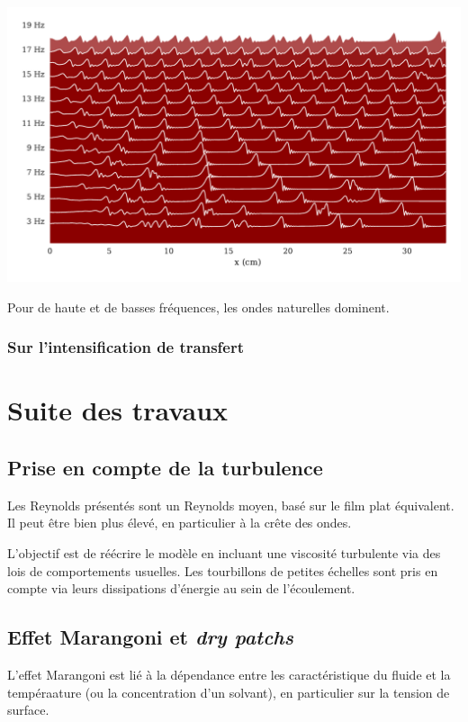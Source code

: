 \documentclass[a0,portrait]{a0poster}
\begin{document}
\begin{multicols}{2}
\begin{multicols}{2}
        \begin{center}
            \includegraphics[width=0.98\columnwidth]{01-frequency_effect}
            \label{fig:thermal}
        \end{center}

        Pour de haute et de basses fréquences, les ondes naturelles dominent.
        \columnbreak

        \subsubsection*{Sur l'intensification de transfert}
    \end{multicols}

    \section*{Suite des travaux}

    \begin{multicols}{2}
        \subsection*{Prise en compte de la turbulence}
        Les Reynolds présentés sont un Reynolds moyen, basé sur le film plat équivalent. Il peut être bien plus élevé, en particulier à la crête des ondes.

        L'objectif est de réécrire le modèle en incluant une viscosité turbulente via des lois de comportements usuelles. Les tourbillons de petites échelles sont pris en compte via leurs dissipations d'énergie au sein de l'écoulement.

        \columnbreak

        \subsection*{Effet Marangoni et \emph{dry patchs}}
        L'effet Marangoni est lié à la dépendance entre les caractéristique du fluide et la tempéraature (ou la concentration d'un solvant), en particulier sur la tension de surface.


\end{multicols}
\end{multicols}
\end{document}
